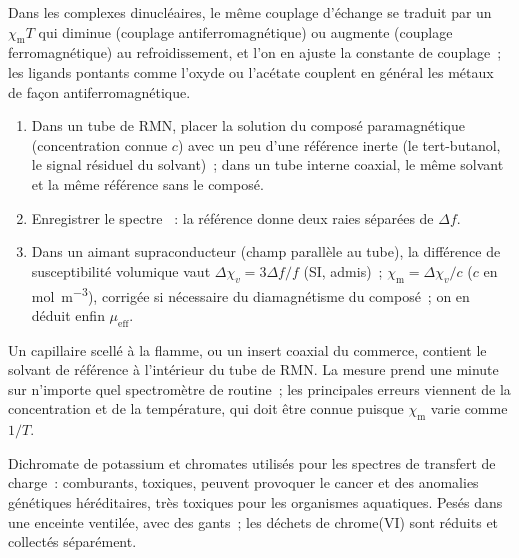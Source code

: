 Dans les complexes dinucléaires, le même couplage d'échange se traduit par
un $\chi_{\mathrm m}T$ qui diminue (couplage antiferromagnétique) ou augmente
(couplage ferromagnétique) au refroidissement, et l'on en ajuste la
constante de couplage~; les ligands pontants comme l'oxyde ou l'acétate
couplent en général les métaux de façon antiferromagnétique.

\begin{method}\label{met:b3:complex-spectra-magnetism:evans}
\begin{enumerate}
  \item Dans un tube de RMN, placer la solution du composé paramagnétique
        (concentration connue $c$) avec un peu d'une référence inerte (le
        tert-butanol, le signal résiduel du solvant)~; dans un tube interne
        coaxial, le même solvant et la même référence sans le composé.
  \item Enregistrer le spectre ~: la référence donne deux raies séparées de $\Delta f$.
  \item Dans un aimant supraconducteur (champ parallèle au tube), la
        différence de susceptibilité volumique vaut $\Delta\chi_v = 3\Delta f/f$ (SI, admis)~; $\chi_{\mathrm m} = \Delta\chi_v/c$ ($c$ en
        \unit{mol.m^{-3}}), corrigée si nécessaire du diamagnétisme du
        composé~; on en déduit enfin $\mu_{\mathrm{eff}}$.
\end{enumerate}
\end{method}

\begin{inthelab}
Un capillaire scellé à la flamme, ou un insert coaxial du commerce, contient
le solvant de référence à l'intérieur du tube de RMN. La mesure prend une
minute sur n'importe quel spectromètre de routine~; les principales erreurs
viennent de la concentration et de la température, qui doit être connue
puisque $\chi_{\mathrm m}$ varie comme $1/T$.
\end{inthelab}

\begin{safety}{}
Dichromate de potassium et chromates utilisés pour les spectres de
transfert de charge~: comburants, toxiques, peuvent provoquer le cancer et
des anomalies génétiques héréditaires, très toxiques pour les organismes
aquatiques. Pesés dans une enceinte ventilée, avec des gants~; les déchets
de chrome(VI) sont réduits et collectés séparément.
\end{safety}

